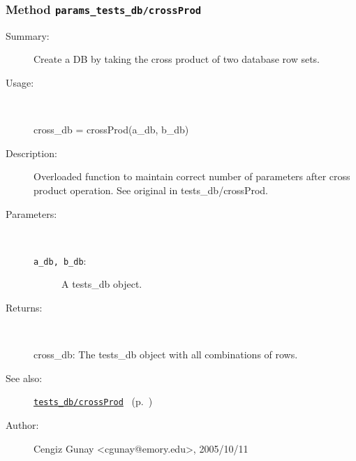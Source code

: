 \subsubsection[Method \texttt{crossProd}]{Method \texttt{params\_tests\_db/crossProd}}%
%
\label{ref_params_tests_db__crossProd}%
\hypertarget{ref_params_tests_db__crossProd}{}%
\begin{description}
\item[Summary:]Create a DB by taking the cross product of two database row sets.
%
\item[Usage:]~%
\begin{lyxcode}%
cross\_db = crossProd(a\_db, b\_db)
%
\end{lyxcode}%
%
\item[Description:]%
Overloaded function to maintain correct number of parameters after
 cross product operation. See original in tests\_db/crossProd.
\item[Parameters:]~
\begin{description}%
\item[\texttt{a\_db, b\_db}:]
 A tests\_db object.
\end{description}%
%
\item[Returns:
]~

	cross\_db: The tests\_db object with all combinations of rows.
%
%
\item[See also:]%
\hyperlink{ref_tests_db__crossProd}{\texttt{tests\_db/crossProd}}%
\ (p.~\pageref{ref_tests_db__crossProd})%
%
%
\item[Author:]%
Cengiz Gunay <cgunay@emory.edu>, 2005/10/11
%
\end{description}
\methodline%
